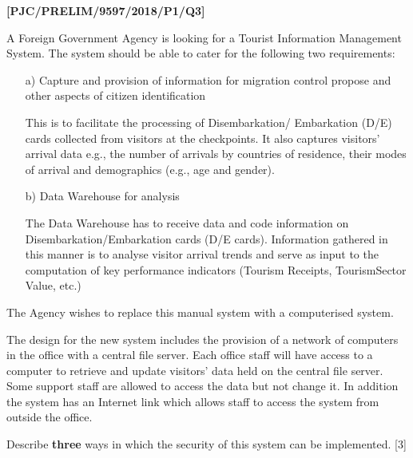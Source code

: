 \item \textbf{{[}PJC/PRELIM/9597/2018/P1/Q3{]} }

\noindent A Foreign Government Agency is looking for a Tourist Information
Management System. The system should be able to cater for the following
two requirements: 
\begin{enumerate}
\item[a)]  Capture and provision of information for migration control propose
and other aspects of citizen identification 

This is to facilitate the processing of Disembarkation/ Embarkation
(D/E) cards collected from visitors at the checkpoints. It also captures
visitors\textquoteright{} arrival data e.g., the number of arrivals
by countries of residence, their modes of arrival and demographics
(e.g., age and gender). 
\item[b)]  Data Warehouse for analysis 

The Data Warehouse has to receive data and code information on Disembarkation/Embarkation
cards (D/E cards). Information gathered in this manner is to analyse
visitor arrival trends and serve as input to the computation of key
performance indicators (Tourism Receipts, TourismSector Value, etc.)
\end{enumerate}
The Agency wishes to replace this manual system with a computerised
system.

The design for the new system includes the provision of a network
of computers in the office with a central file server. Each office
staff will have access to a computer to retrieve and update visitors\textquoteright{}
data held on the central file server. Some support staff are allowed
to access the data but not change it. In addition the system has an
Internet link which allows staff to access the system from outside
the office. 

Describe \textbf{three} ways in which the security of this system
can be implemented. \hfill{}{[}3{]}